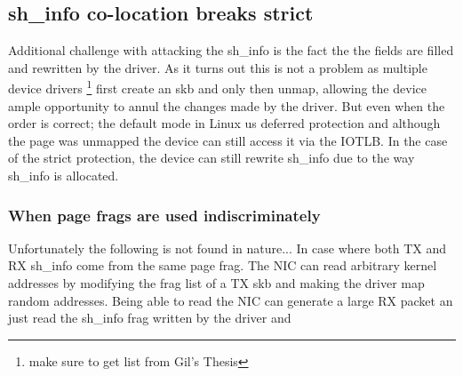 \subsection{sh\_info co-location breaks strict}
Additional challenge with attacking the sh\_info is the fact the the fields are filled and rewritten by the driver. As it turns out this is not a problem as multiple device drivers \footnote{make sure to get list from Gil's Thesis} first create an skb and only then unmap, allowing the device ample opportunity to annul the changes made by the driver. But even when the order is correct; the default mode in Linux us deferred protection and although the page was unmapped the device can still access it via the IOTLB. In the case of the strict protection, the device can still rewrite sh\_info due to the way sh\_info is allocated. 
\subsubsection{When page frags are used indiscriminately}
Unfortunately the following is not found in nature...\newline
In case where both TX and RX sh\_info come from the same page frag. The NIC can read arbitrary kernel addresses by modifying the frag list of a TX skb and making the driver map random addresses.
Being able to read the NIC can generate a large RX packet an just read the sh\_info frag written by the driver and 